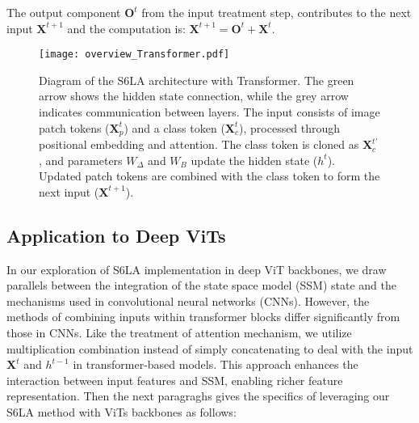  The output component $\boldsymbol{O}^{t}$ from the input treatment step, contributes to the next input $\boldsymbol{X}^{t+1}$ and the computation is: $\boldsymbol{X}^{t+1} = \boldsymbol{O}^{t} + \boldsymbol{X}^{t}$.

\begin{figure}[t]
\begin{center}
\texttt{[image: overview\_Transformer.pdf]}
\end{center}
Diagram of the S6LA architecture with Transformer. The green arrow shows the hidden state connection, while the grey arrow indicates communication between layers. The input consists of image patch tokens (\( \boldsymbol{X}^{t}_p \)) and a class token (\( \boldsymbol{X}^{t}_c \)), processed through positional embedding and attention. The class token is cloned as $\boldsymbol{X}_c^{t'}$, and parameters \( W_\Delta \) and \( W_B \) update the hidden state (\( h^t \)). Updated patch tokens are combined with the class token to form the next input (\( \boldsymbol{X}^{t+1} \)).
\label{fig:overview_Transformer}
\end{figure}

\subsection{Application to Deep ViTs}

In our exploration of S6LA implementation in deep ViT backbones, we draw parallels between the integration of the state space model (SSM) state and the mechanisms used in convolutional neural networks (CNNs). However, the methods of combining inputs within transformer blocks differ significantly from those in CNNs. Like the treatment of attention mechanism, we utilize multiplication combination instead of simply concatenating to deal with the input $\boldsymbol{X}^{t}$ and $h^{t-1}$ in transformer-based models. This approach enhances the interaction between input features and SSM, enabling richer feature representation. Then the next paragraghs gives the specifics of leveraging our S6LA method with ViTs backbones as follows:


